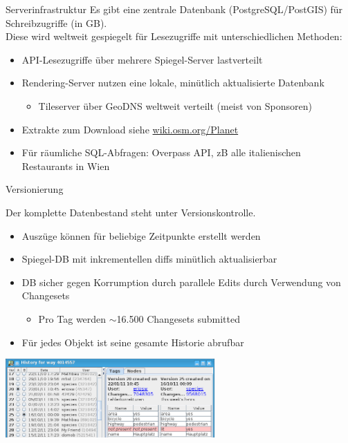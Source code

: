 \documentclass[handout]{beamer}
\begin{document}
\begin{frame}{Serverinfrastruktur}
Es gibt eine zentrale Datenbank (PostgreSQL/PostGIS) für Schreibzugriffe (in GB).\\
\pause
Diese wird weltweit gespiegelt für Lesezugriffe mit unterschiedlichen Methoden:

\begin{itemize}
  \item API-Lesezugriffe über mehrere Spiegel-Server lastverteilt
  \item Rendering-Server nutzen eine lokale, minütlich aktualisierte Datenbank
  \begin{itemize}
    \item Tileserver über GeoDNS weltweit verteilt (meist von Sponsoren)
  \end{itemize}
  \item Extrakte zum Download siehe \href{http://wiki.osm.org/Planet}{wiki.osm.org/Planet}
  \item Für räumliche SQL-Abfragen: Overpass API, zB alle italienischen Restaurants in Wien
\end{itemize}

\end{frame}


\begin{frame}{Versionierung}

Der komplette Datenbestand steht unter Versionskontrolle.
\begin{itemize}
  \item Auszüge können für beliebige Zeitpunkte erstellt werden
  \item Spiegel-DB mit inkrementellen diffs minütlich aktualisierbar
  \item DB sicher gegen Korrumption durch parallele Edits durch Verwendung von Changesets
  \begin{itemize}
    \item Pro Tag werden $\sim$16.500 Changesets submitted
  \end{itemize}
  \item Für jedes Objekt ist seine gesamte Historie abrufbar
\end{itemize}

 \hfill \includegraphics[width=8cm]{history.png}


\end{frame}
\end{document}
